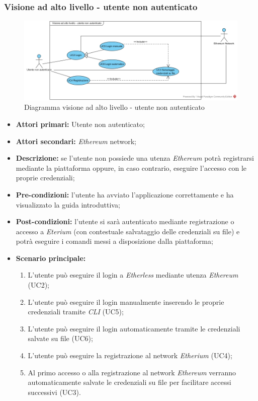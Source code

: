 \subsubsection{Visione ad alto livello - utente non autenticato}
\begin{figure}[h]
	\centering
	\includegraphics[width=\linewidth]{res/img/utenteNonAutenticato.jpg}
	\caption{Diagramma visione ad alto livello - utente non autenticato}
\end{figure}
\begin{itemize}
	\item \textbf{Attori primari:} Utente non autenticato;
	\item \textbf{Attori secondari:} \textit{Ethereum\glo} network;
	\item \textbf{Descrizione:} se l'utente non possiede una utenza \textit{Ethereum\glo} potrà registrarsi mediante la piattaforma oppure, in caso contrario, eseguire l'accesso con le proprie credenziali; 
	\item \textbf{Pre-condizioni:} l'utente ha avviato l'applicazione correttamente e ha visualizzato la guida introduttiva; 
	\item \textbf{Post-condizioni:} l'utente si sarà autenticato mediante registrazione o accesso a \textit{Eterium\glo} (con contestuale salvataggio delle credenziali su file) e potrà eseguire i comandi messi a disposizione dalla piattaforma;
	\item \textbf{Scenario principale:} 
	\begin{enumerate}
		\item L'utente può eseguire il login a \textit{Etherless} mediante utenza \textit{Ethereum\glo} (UC2);
		\item L'utente può eseguire il login manualmente inserendo le proprie credenziali tramite \textit{CLI\glo} (UC5);
		\item L'utente può eseguire il login automaticamente tramite le credenziali salvate su file (UC6);
		\item L'utente può eseguire la registrazione al network \textit{Etherium\glo} (UC4);
		\item Al primo accesso o alla registrazione al network \textit{Ethereum\glo} verranno automaticamente salvate le credenziali su file per facilitare accessi successivi (UC3).
	\end{enumerate}
\end{itemize}